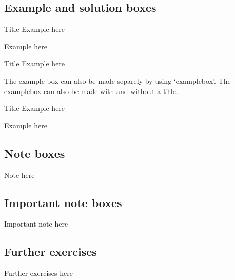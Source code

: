 \documentclass[11pt,a4paper,twoside]{report}
\begin{document}
\subsection{Example and solution boxes}

\begin{example}{Title}
  Example here
\end{example}

\begin{example}{}
  Example here
\end{example}


\begin{example}[height=2.5cm]{Title}
  Example here
\end{example}

The example box can also be made separely by using `examplebox'. The examplebox can also be made with and without a title.

\begin{examplebox}{Title}
  Example here
\end{examplebox}

\begin{examplebox}
  Example here
\end{examplebox}

\subsection{Note boxes}

\begin{note}
  Note here
\end{note}

\subsection{Important note boxes}

\begin{important}
  Important note here
\end{important}

\subsection{Further exercises}

\begin{further}
  Further exercises here
\end{further}
\end{document}
